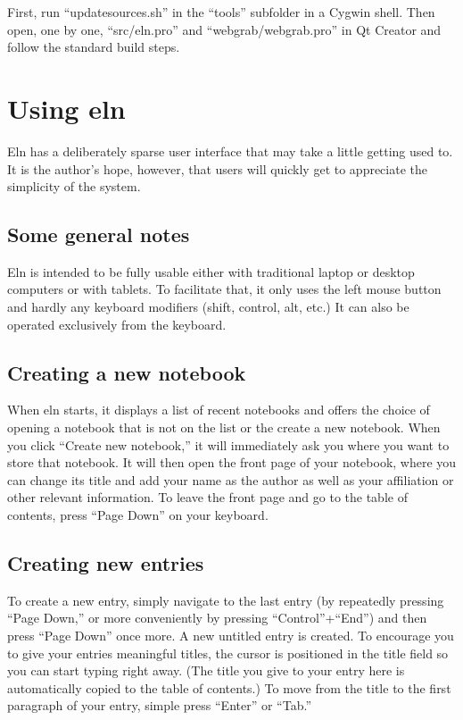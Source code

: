 \documentclass[11pt]{report}
\begin{document}
First, run ``updatesources.sh'' in the
``tools'' subfolder in a Cygwin shell. Then open, one by one, ``src/eln.pro''
and ``webgrab/webgrab.pro'' in Qt
Creator and follow the standard build steps.

\chapter{Using eln}

Eln has a deliberately sparse user interface that may take a little
getting used to. It is the author's hope, however, that users will
quickly get to appreciate the simplicity of the system.

\section{Some general notes}

Eln is intended to be fully usable either with traditional laptop or
desktop computers or with tablets. To facilitate that, it only uses
the left mouse button and hardly any keyboard modifiers (shift,
control, alt, etc.) It can also be operated exclusively from the
keyboard.

\section{Creating a new notebook}

When eln starts, it displays a list of recent notebooks and offers the
choice of opening a notebook that is not on the list or the create a
new notebook. When you click ``Create new notebook,'' it will
immediately ask you where you want to store that notebook. It will
then open the front page of your notebook, where you can change its
title and add your name as the author as well as your affiliation or
other relevant information. To
leave the front page and go to the table of contents, press ``Page
Down'' on your keyboard.

\section{Creating new entries}

To create a new entry, simply navigate to the last entry (by
repeatedly pressing ``Page Down,'' or more conveniently by pressing
``Control''+``End'') and then press ``Page Down'' once more. A new
untitled entry is created. To encourage you to give your entries
meaningful titles, the cursor is positioned in the title field so you
can start typing right away. (The title you give to your entry here is
automatically copied to the table of contents.) To move from the title
to the first paragraph of your entry, simple press ``Enter'' or ``Tab.''
\end{document}
